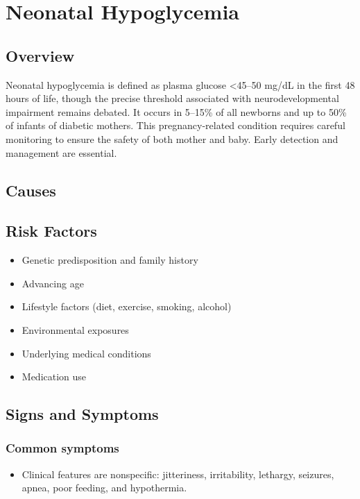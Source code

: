 \chapter{Neonatal Hypoglycemia}
\label{sec:Neonatal Hypoglycemia}

\section{Overview}
Neonatal hypoglycemia is defined as plasma glucose <45--50 mg/dL in the first 48 hours of life, though the precise threshold associated with neurodevelopmental impairment remains debated. It occurs in 5--15\% of all newborns and up to 50\% of infants of diabetic mothers. This pregnancy-related condition requires careful monitoring to ensure the safety of both mother and baby. Early detection and management are essential.
\section{Causes}
\section{Risk Factors}

\begin{itemize}[noitemsep]
  \item Genetic predisposition and family history
  \item Advancing age
  \item Lifestyle factors (diet, exercise, smoking, alcohol)
  \item Environmental exposures
  \item Underlying medical conditions
  \item Medication use
\end{itemize}
\section{Signs and Symptoms}

\subsection{Common symptoms}
\begin{itemize}[noitemsep]
  \item Clinical features are nonspecific: jitteriness, irritability, lethargy, seizures, apnea, poor feeding, and hypothermia. 
  \end{itemize}

